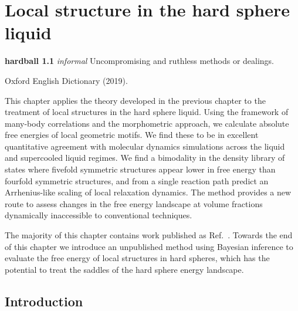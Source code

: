 \documentclass[11pt,twoside]{report}
\begin{document}
\chapter{Local structure in the hard sphere liquid}
\epigraph{\textbf{hardball 1.1} \emph{informal} Uncompromising and ruthless methods or dealings.}{Oxford English Dictionary (2019).}
\label{chapter:morphometric-applications}

This chapter applies the theory developed in the previous chapter to the treatment of local structures in the hard sphere liquid.
Using the framework of many-body correlations and the morphometric approach, we calculate absolute free energies of local geometric motifs.
We find these to be in excellent quantitative agreement with molecular dynamics simulations across the liquid and supercooled liquid regimes.
We find a bimodality in the density library of states where fivefold symmetric structures appear lower in free energy than fourfold symmetric structures, and from a single reaction path predict an Arrhenius-like scaling of local relaxation dynamics.
The method provides a new route to assess changes in the free energy landscape at volume fractions dynamically inaccessible to conventional techniques.

The majority of this chapter contains work published as Ref.\ \cite{RobinsonPRL2019}.
Towards the end of this chapter we introduce an unpublished method using Bayesian inference to evaluate the free energy of local structures in hard spheres, which has the potential to treat the saddles of the hard sphere energy landscape.


\section{Introduction}
\end{document}
